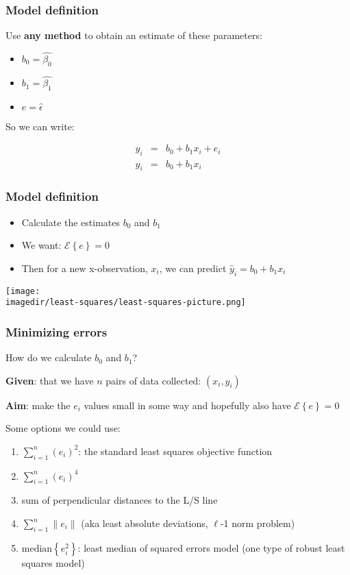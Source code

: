 \begin{frame}\frametitle{Model definition}

	Use \textbf{any method} to obtain an estimate of these parameters:
	\begin{itemize}
		\item	$b_0 = \hat{\beta_0}$
		\item	$b_1 = \hat{\beta_1}$
		\item	$e = \hat{\epsilon}$
	\end{itemize}

	So we can write:

	$$
	\begin{array}{rcl}
		y_i &=& b_0 + b_1 x_i + e_i \\
		\hat{y}_i &=& b_0 + b_1 x_i
	\end{array}
	$$
\end{frame}

\begin{frame}\frametitle{Model definition}
	\begin{itemize}
		\item	Calculate the estimates $b_0$ and $b_1$
		\item	We want: $\mathcal{E}\left\{e\right\} = 0$
		\item	Then for a new x-observation, $x_i$, we can predict $\hat{y}_i =b_0 + b_1x_{i}$
	\end{itemize}
	\begin{center}
		\texttt{[image: \\imagedir/least-squares/least-squares-picture.png]}
	\end{center}
\end{frame}

\begin{frame}\frametitle{Minimizing errors}

	How do we calculate $b_0$ and $b_1$?

	\textbf{Given}: that we have $n$ pairs of data collected: $(x_i, y_i)$

	\textbf{Aim}: make the $e_i$ values small in some way and hopefully also have $\mathcal{E}\left\{e\right\} = 0$

	\vspace{24pt}
	Some options we could use:
	\begin{enumerate}
		\item	$\sum_{i=1}^{n}{(e_i)^2}$: the standard least squares objective function
		\item	$\sum_{i=1}^{n}{(e_i)^4}$
		\item	sum of perpendicular distances to the L/S line
		\item	$\sum_{i=1}^{n}{\|e_i\|}$ (aka least absolute deviations, $\ell$-1 norm problem)
		\item	$\text{median}\left\{ e_i^2 \right\}$: least median of squared errors model (one type of robust least squares model)
	\end{enumerate}
\end{frame}

